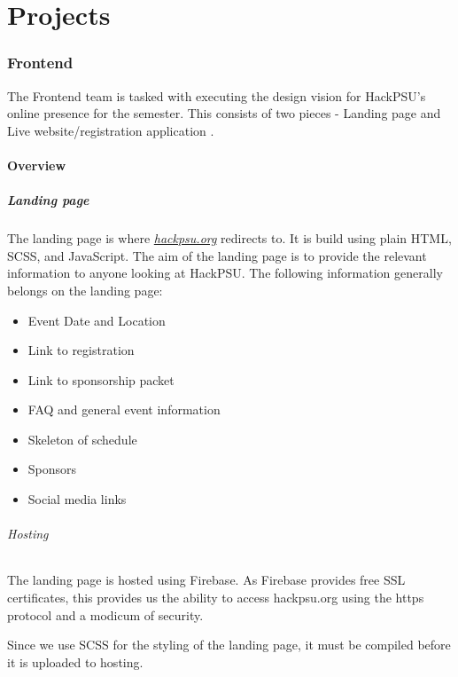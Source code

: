 \documentclass[twoside, 12pt]{article}
\newenvironment{tightitemize} %
{\begin{itemize}\itemsep1pt \parskip0pt \parsep0pt}
{\end{itemize}\vspace{-\topsep}}
\begin{document}
\newpage
\mbox{}
\vfill
\part{Projects} \label{part:projects}
\newpage
\section{Frontend} \label{section:registration}
\par The Frontend team is tasked with executing the design vision for HackPSU's online presence for the semester. This consists of two pieces - Landing page and Live website/registration application \cite{frontend_repo}. 
\subsection{Overview}
\subsubsection{Landing page}
\par The landing page is where \href{https://hackpsu.org}{\textit{hackpsu.org}} redirects to. It is build using plain HTML, SCSS, and JavaScript. The aim of the landing page is to provide the relevant information to anyone looking at HackPSU. The following information generally belongs on the landing page:
\begin{tightitemize}
    \item Event Date and Location
    \item Link to registration
    \item Link to sponsorship packet
    \item FAQ and general event information
    \item Skeleton of schedule
    \item Sponsors
    \item Social media links
\end{tightitemize}
\paragraph{Hosting}
\par The landing page is hosted using Firebase. As Firebase provides free SSL certificates, this provides us the ability to access hackpsu.org using the https protocol and a modicum of security. 
\par Since we use SCSS for the styling of the landing page, it must be compiled before it is uploaded to hosting.
\end{document}
